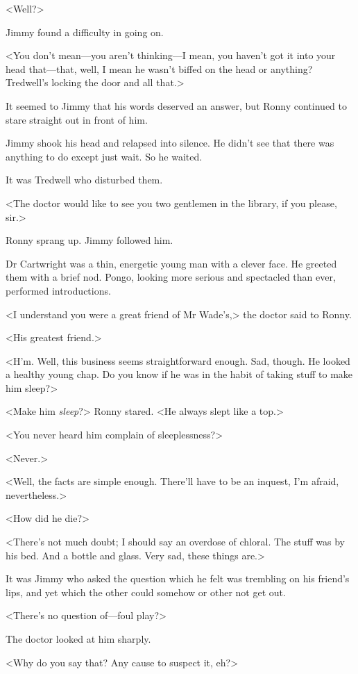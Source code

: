 <Well?>

Jimmy found a difficulty in going on.

<You don't mean—you aren't thinking—I mean, you haven't got it into your head that—that, well, I mean he wasn't biffed on the head or anything? Tredwell's locking the door and all that.>

It seemed to Jimmy that his words deserved an answer, but Ronny continued to stare straight out in front of him.

Jimmy shook his head and relapsed into silence. He didn't see that there was anything to do except just wait. So he waited.

It was Tredwell who disturbed them.

<The doctor would like to see you two gentlemen in the library, if you please, sir.>

Ronny sprang up. Jimmy followed him.

Dr Cartwright was a thin, energetic young man with a clever face. He greeted them with a brief nod. Pongo, looking more serious and spectacled than ever, performed introductions.

<I understand you were a great friend of Mr Wade's,> the doctor said to Ronny.

<His greatest friend.>

<H'm. Well, this business seems straightforward enough. Sad, though. He looked a healthy young chap. Do you know if he was in the habit of taking stuff to make him sleep?>

<Make him \emph{sleep}?> Ronny stared. <He always slept like a top.>

<You never heard him complain of sleeplessness?>

<Never.>

<Well, the facts are simple enough. There'll have to be an inquest, I'm afraid, nevertheless.>

<How did he die?>

<There's not much doubt; I should say an overdose of chloral. The stuff was by his bed. And a bottle and glass. Very sad, these things are.>

It was Jimmy who asked the question which he felt was trembling on his friend's lips, and yet which the other could somehow or other not get out.

<There's no question of—foul play?>

The doctor looked at him sharply.

<Why do you say that? Any cause to suspect it, eh?>

